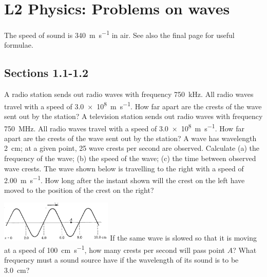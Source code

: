 \documentclass[a4paper]{exam}
\begin{document}
  \section*{L2 Physics: Problems on waves}
  The speed of sound is \SI{340}{\metre\per\second} in air. See also the final page for useful formulae.
  \subsection*{Sections 1.1-1.2}
  \begin{questions}
    \question A radio station sends out radio waves with frequency \SI{750}{\kilo\hertz}. All radio waves travel with a speed
              of \SI{3.0e8}{\metre\per\second}. How far apart are the crests of the wave sent out by the station?
    \question A television station sends out radio waves with frequency \SI{750}{\mega\hertz}. All radio waves travel with a speed
              of \SI{3.0e8}{\metre\per\second}. How far apart are the crests of the wave sent out by the station?
    \question A wave has wavelength \SI{2}{\centi\metre}; at a given point, 25 wave crests per second are observed. Calculate
              (a) the frequency of the wave; (b) the speed of the wave; (c) the time between observed wave crests.
    \question The wave shown below is travelling to the right with a speed of \SI{2.00}{\metre\per\second}. How long
              after the instant shown will the crest on the left have moved to the position of the crest on the right?

              \includegraphics[width=0.4\textwidth]{beuche132}
    \question If the same wave is slowed so that it is moving at a speed of \SI{100}{\centi\metre\per\second}, how many
              crests per second will pass point $ A $?
    \question What frequency must a sound source have if the wavelength of its sound is to be \SI{3.0}{\centi\metre}?
  \end{questions}
\end{document}
